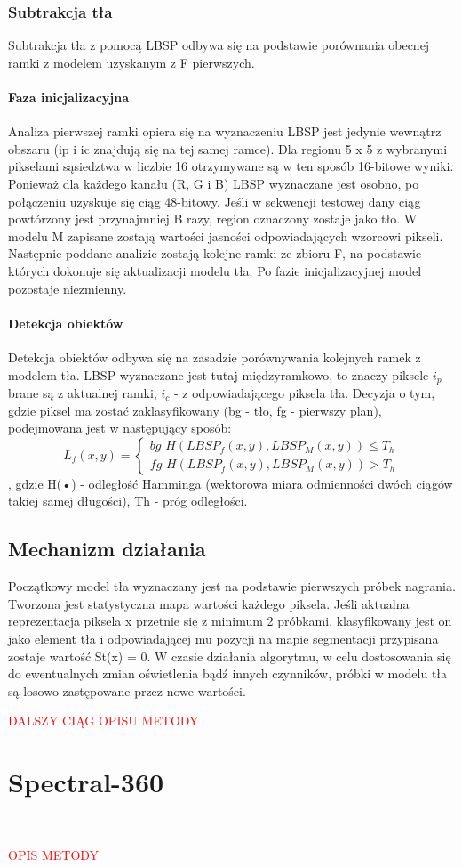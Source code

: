 \subsubsection{Subtrakcja tła}
Subtrakcja tła z pomocą LBSP odbywa się na podstawie porównania obecnej ramki z modelem uzyskanym z F pierwszych. 
\paragraph{Faza inicjalizacyjna \\}
Analiza pierwszej ramki opiera się na wyznaczeniu LBSP  jest jedynie wewnątrz obszaru (ip i ic znajdują się na tej samej ramce). Dla regionu 5 x 5 z wybranymi pikselami sąsiedztwa w liczbie 16 otrzymywane są w ten sposób 16-bitowe wyniki. Ponieważ dla każdego kanału (R, G i B) LBSP wyznaczane jest osobno, po połączeniu uzyskuje się ciąg 48-bitowy. Jeśli w sekwencji testowej dany ciąg powtórzony jest przynajmniej B razy, region oznaczony zostaje jako tło. W modelu M zapisane zostają wartości jasności odpowiadających wzorcowi pikseli. Następnie poddane analizie zostają kolejne ramki ze zbioru F, na podstawie których dokonuje się aktualizacji modelu tła. Po fazie inicjalizacyjnej model pozostaje niezmienny.
\paragraph{Detekcja obiektów \\}
Detekcja obiektów odbywa się na zasadzie porównywania kolejnych ramek z modelem tła. LBSP wyznaczane jest tutaj międzyramkowo, to znaczy piksele $i_{p}$ brane są z aktualnej ramki, $i_{c}$ - z odpowiadającego piksela tła. Decyzja o tym, gdzie piksel ma zostać zaklasyfikowany (bg - tło, fg - pierwszy plan), podejmowana jest w następujący sposób:
\begin{equation}
L_{f}(x,y)=\left\{\substack{
bg \, \, H(LBSP_{f}(x,y),LBSP_{M}(x,y))\leq T_{h} \\[0.5em]
fg \, \, H(LBSP_{f}(x,y),LBSP_{M}(x,y))>T_{h}}\right.
\end{equation}
, gdzie H(•) - odległość Hamminga (wektorowa miara odmienności dwóch ciągów takiej samej długości), Th - próg odległości.
\subsection{Mechanizm działania}
Początkowy model tła wyznaczany jest na podstawie pierwszych próbek nagrania. Tworzona jest statystyczna mapa wartości każdego piksela. Jeśli aktualna reprezentacja piksela x przetnie się z minimum 2 próbkami, klasyfikowany jest on jako element tła i odpowiadającej mu pozycji na mapie segmentacji przypisana zostaje wartość St(x) = 0. W czasie działania algorytmu, w celu dostosowania się do ewentualnych zmian oświetlenia bądź innych czynników, próbki w modelu tła są losowo zastępowane przez nowe wartości.\\
\begin{LARGE}
\textcolor{red}{DALSZY CIĄG OPISU METODY}
\end{LARGE}
\section{Spectral-360}
\cite{6910013}\\
\begin{LARGE}
\textcolor{red}{OPIS METODY}
\end{LARGE}


